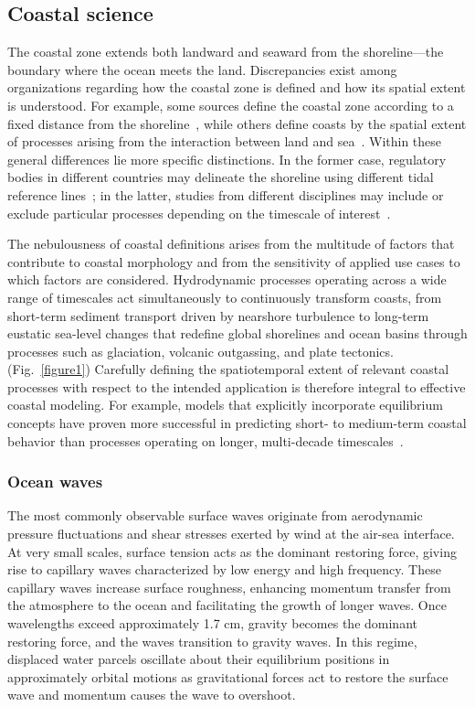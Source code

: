 \documentclass[12pt]{article}
\begin{document}
\subsection{Coastal science}

The coastal zone extends both landward and seaward from the shoreline—the boundary where the ocean meets the land. Discrepancies exist among organizations regarding how the coastal zone is defined and how its spatial extent is understood. For example, some sources define the coastal zone according to a fixed distance from the shoreline~\cite{NOAACoastalWatersGlossary}, while others define coasts by the spatial extent of processes arising from the interaction between land and sea~\cite{LibreTexts}. Within these general differences lie more specific distinctions. In the former case, regulatory bodies in different countries may delineate the shoreline using different tidal reference lines~\cite{PellachAlterman2021}; in the latter, studies from different disciplines may include or exclude particular processes depending on the timescale of interest~\cite{LibreTexts}.

The nebulousness of coastal definitions arises from the multitude of factors that contribute to coastal morphology and from the sensitivity of applied use cases to which factors are considered. Hydrodynamic processes operating across a wide range of timescales act simultaneously to continuously transform coasts, from short-term sediment transport driven by nearshore turbulence to long-term eustatic sea-level changes that redefine global shorelines and ocean basins through processes such as glaciation, volcanic outgassing, and plate tectonics. (Fig.~\ref{figure1}) Carefully defining the spatiotemporal extent of relevant coastal processes with respect to the intended application is therefore integral to effective coastal modeling. For example, models that explicitly incorporate equilibrium concepts have proven more successful in predicting short- to medium-term coastal behavior than processes operating on longer, multi-decade timescales~\cite{Hunt2023}.

\subsubsection{Ocean waves}

The most commonly observable surface waves originate from aerodynamic pressure fluctuations and shear stresses exerted by wind at the air-sea interface. At very small scales, surface tension acts as the dominant restoring force, giving rise to capillary waves characterized by low energy and high frequency. These capillary waves increase surface roughness, enhancing momentum transfer from the atmosphere to the ocean and facilitating the growth of longer waves. Once wavelengths exceed approximately 1.7 cm, gravity becomes the dominant restoring force, and the waves transition to gravity waves. In this regime, displaced water parcels oscillate about their equilibrium positions in approximately orbital motions as gravitational forces act to restore the surface wave and momentum causes the wave to overshoot.~\cite{Garrison2012, Masselink2014, Kinsman1984}
\end{document}
